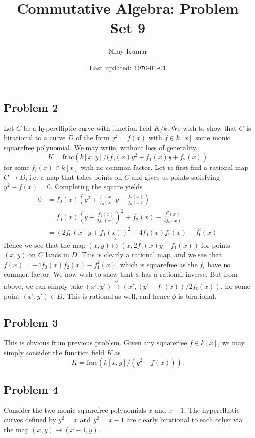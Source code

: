 \documentclass{../../mathnotes}
\title{Commutative Algebra: Problem Set 9}
\author{Nilay Kumar}
\date{Last updated: \today}
\begin{document}
\maketitle

\subsection*{Problem 2}

Let $C$ be a hyperelliptic curve with function field $K/k$. We wish to show that $C$ is birational to a curve $D$ of the form $y^2=f(x)$
with $f\in k[x]$ some monic squarefree polynomial. We may write, without loss of generality,
\[K=\text{frac}\left(k[x,y]/(f_0(x)y^2+f_1(x)y+f_2(x)\right)\]
for some $f_i(x)\in k[x]$ with no common factor. Let us first find a rational map $C\to D$, i.e. a map that takes points on $C$ and gives us points satisfying $y^2-f(x)=0$.
Completing the square yields
\begin{align*}
    0&=f_0(x)\left( y^2+\frac{f_1(x)}{f_0(x)}y+\frac{f_2(x)}{f_0(x)} \right)\\
    &=f_0(x)\left( y +\frac{f_1(x)}{2f_0(x)} \right)^2+f_2(x)-\frac{f_1^2(x)}{4f_0(x)}\\
    &=\left(2f_0(x)y+f_1(x)  \right)^2+4f_0(x)f_2(x)+f_1^2(x)
\end{align*}
Hence we see that the map $(x,y)\overset{\phi}{\mapsto} (x,2f_0(x)y+f_1(x))$ for points $(x,y)$ on $C$ lands in $D$. This is clearly a rational map,
and we see that $f(x)=-4f_0(x)f_2(x)-f_1^2(x)$, which is squarefree as the $f_i$ have no common factor.
We now wish to show that $\phi$ has a rational inverse. But from above, we can simply take $(x',y')\overset{\phi}{\mapsto}(x',(y'-f_1(x))/2f_0(x))$.
for some point $(x',y')\in D$. This is rational as well, and hence $\phi$ is birational.

\subsection*{Problem 3}

This is obvious from previous problem. Given any squarefree $f\in k[x]$, we may simply consider the function field $K$
as
\[K=\text{frac}\left( k[x,y]/(y^2-f(x)) \right).\]

\subsection*{Problem 4}

Consider the two monic squarefree polynomials $x$ and $x-1$. The hyperelliptic curves defined by $y^2=x$ and $y^2=x-1$ are clearly
birational to each other via the map $(x,y)\mapsto(x-1,y)$.
\end{document}

